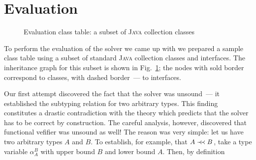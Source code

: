 \section{Evaluation}
\label{sec:eval}

\begin{figure}[h]
  \caption{Evaluation class table: a subset of \textsc{Java} collection classes}
  \label{fig:class-graph}
\end{figure}

To perform the evaluation of the solver we came up with we prepared a sample class table using a subset of standard \textsc{Java} collection classes and interfaces. The
inheritance graph for this subset is shown in Fig.~\ref{fig:class-graph}; the nodes with sold border correspond to classes, with dashed border~--- to interfaces.

Our first attempt discovered the fact that the solver was unsound~--- it established the subtyping relation for two arbitrary types. This finding constitutes a drastic
contradiction with the theory which predicts that the solver has to be correct by construction. The careful analysis, however, discovered that functional
vefifier was unsound as well! The reason was very simple: let us have two arbitrary types $A$ and $B$. To establish, for example, that $A \prec\mathrel{\mkern-5mu}\prec B$, take a
type variable $\alpha^B_A$ with upper bound $B$ and lower bound $A$. Then, by definition

